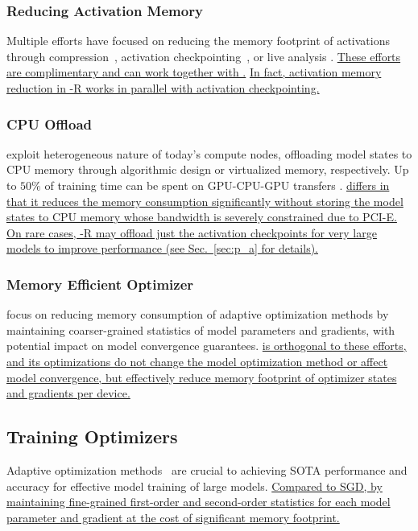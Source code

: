 \subsubsection{Reducing Activation Memory}

Multiple efforts have focused on reducing the memory footprint of activations through compression~\cite{jain2018gist}, activation checkpointing~\cite{DBLP:journals/corr/ChenXZG16, Jain2019CheckmateBT}, or live analysis \cite{DBLP:journals/corr/abs-1801-04380}. \uline{These efforts are complimentary and can work together with \name.} \uline{In fact, activation memory reduction in \name-R works in parallel with activation checkpointing.}

\subsubsection{CPU Offload}

\cite{layer2layer, 7783721} exploit heterogeneous nature of today's compute nodes, offloading model states to CPU memory through algorithmic design or virtualized memory, respectively. Up to $50\%$ of training time can be spent on GPU-CPU-GPU transfers \cite{layer2layer}. \uline{\name differs in that it reduces the memory consumption significantly without storing the model states to CPU memory whose bandwidth is severely constrained due to PCI-E.} \uline{On rare cases, \name-R may offload just the activation checkpoints for very large models to improve performance (see Sec.~\ref{sec:p_a} for details).}

\subsubsection{Memory Efficient Optimizer}

\cite{DBLP:journals/corr/adafactor,Anil2019MemoryEfficientAO} focus on reducing memory consumption of adaptive optimization methods by maintaining coarser-grained statistics of model parameters and gradients, with potential impact on model convergence guarantees. \uline{\name is orthogonal to these efforts, and its optimizations 
do not change the model optimization method or affect model convergence, but effectively reduce memory footprint of optimizer states and gradients per device.}

\subsection{Training Optimizers }

Adaptive optimization methods~\cite{10.5555/Adagrad,DBLP:journals/corr/Adam,DBLP:journals/corr/You-LARS,DBLP:journals/corr/You-LAMB} are crucial to achieving SOTA performance and accuracy for effective model training of large models. \uline{Compared to SGD, by maintaining fine-grained first-order and second-order statistics for each model parameter and gradient at the cost of significant memory footprint.}